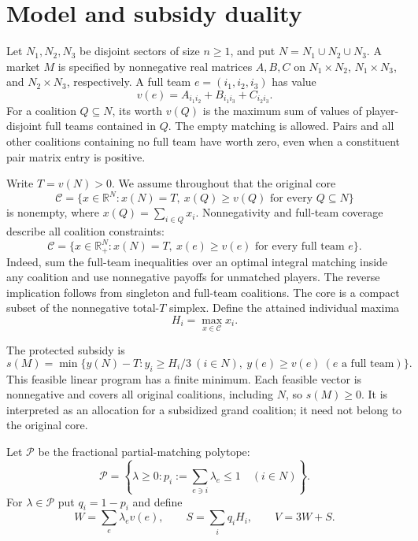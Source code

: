 \documentclass[11pt]{article}
\theoremstyle{remark}
\newcommand{\R}{\mathbb R}
\newcommand{\core}{\mathcal C}
\newcommand{\pack}{\mathcal P}
\begin{document}
\section{Model and subsidy duality}\label{sec:model}
Let $N_1,N_2,N_3$ be disjoint sectors of size $n\ge1$, and put
$N=N_1\cup N_2\cup N_3$. A market $M$ is specified by nonnegative real
matrices $A,B,C$ on $N_1\times N_2$, $N_1\times N_3$, and
$N_2\times N_3$, respectively. A full team $e=(i_1,i_2,i_3)$ has value
\begin{equation}\label{eq:team}
                  v(e)=A_{i_1i_2}+B_{i_1i_3}+C_{i_2i_3}.
\end{equation}
For a coalition $Q\subseteq N$, its worth $v(Q)$ is the maximum sum of
values of player-disjoint full teams contained in $Q$. The empty matching
is allowed. Pairs and all other coalitions containing no full team have
worth zero, even when a constituent pair matrix entry is positive.

Write $T=v(N)>0$. We assume throughout that the original core
\[
 \core=\{x\in\R^N:x(N)=T,\ x(Q)\ge v(Q)\text{ for every }Q\subseteq N\}
\]
is nonempty, where $x(Q)=\sum_{i\in Q}x_i$.
Nonnegativity and full-team coverage describe all coalition constraints:
\begin{equation}\label{eq:core}
 \core=\{x\in\R_+^N:x(N)=T,\ x(e)\ge v(e)\text{ for every full team }e\}.
\end{equation}
Indeed, sum the full-team inequalities over an optimal integral matching
inside any coalition and use nonnegative payoffs for unmatched players.
The reverse implication follows from singleton and full-team coalitions.
The core is a compact subset of the nonnegative total-$T$ simplex. Define
the attained individual maxima
\begin{equation}\label{eq:ideals}
                        H_i=\max_{x\in\core}x_i.
\end{equation}

The protected subsidy is
\begin{equation}\label{eq:subsidy}
 s(M)=\min\{y(N)-T:y_i\ge H_i/3\ (i\in N),\
                         y(e)\ge v(e)\ (e\text{ a full team})\}.
\end{equation}
This feasible linear program has a finite minimum. Each feasible vector
is nonnegative and covers all original coalitions, including $N$, so
$s(M)\ge0$. It is interpreted as an allocation for a subsidized grand
coalition; it need not belong to the original core.

Let $\pack$ be the fractional partial-matching polytope:
\[
 \pack=\left\{\lambda\ge0:
               p_i:=\sum_{e\ni i}\lambda_e\le1\quad(i\in N)\right\}.
\]
For $\lambda\in\pack$ put $q_i=1-p_i$ and define
\begin{equation}\label{eq:dualquantities}
 W=\sum_e\lambda_e v(e),\qquad
 S=\sum_iq_iH_i,\qquad V=3W+S.
\end{equation}
\end{document}
